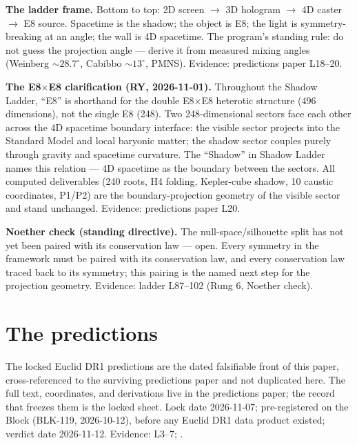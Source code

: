 \documentclass{alienfolio}
\begin{document}
\noindent\textbf{The ladder frame.} Bottom to top: 2D screen $\to$ 3D hologram $\to$ 4D caster $\to$ E8 source. Spacetime is the shadow; the object is E8; the light is symmetry-breaking at an angle; the wall is 4D spacetime. The program's standing rule: do not guess the projection angle --- derive it from measured mixing angles (Weinberg $\sim28.7^\circ$, Cabibbo $\sim13^\circ$, PMNS). Evidence: predictions paper L18--20.

\noindent\textbf{The E8$\times$E8 clarification (RY, 2026-11-01).} Throughout the Shadow Ladder, ``E8'' is shorthand for the double E8$\times$E8 heterotic structure (496 dimensions), not the single E8 (248). Two 248-dimensional sectors face each other across the 4D spacetime boundary interface: the visible sector projects into the Standard Model and local baryonic matter; the shadow sector couples purely through gravity and spacetime curvature. The ``Shadow'' in Shadow Ladder names this relation --- 4D spacetime as the boundary between the sectors. All computed deliverables (240 roots, H4 folding, Kepler-cube shadow, 10 caustic coordinates, P1/P2) are the boundary-projection geometry of the visible sector and stand unchanged. Evidence: predictions paper L20.

\noindent\textbf{Noether check (standing directive).} The null-space/silhouette split has not yet been paired with its conservation law --- open. Every symmetry in the framework must be paired with its conservation law, and every conservation law traced back to its symmetry; this pairing is the named next step for the projection geometry. Evidence: ladder L87--102 (Rung 6, Noether check).

\section{The predictions}
\label{sec:predictions}
The locked Euclid DR1 predictions are the dated falsifiable front of this paper, cross-referenced to the surviving predictions paper and not duplicated here. The full text, coordinates, and derivations live in the predictions paper; the record that freezes them is the locked sheet. Lock date 2026-11-07; pre-registered on the Block (BLK-119, 2026-10-12), before any Euclid DR1 data product existed; verdict date 2026-11-12. Evidence:  L3--7; .
\end{document}
